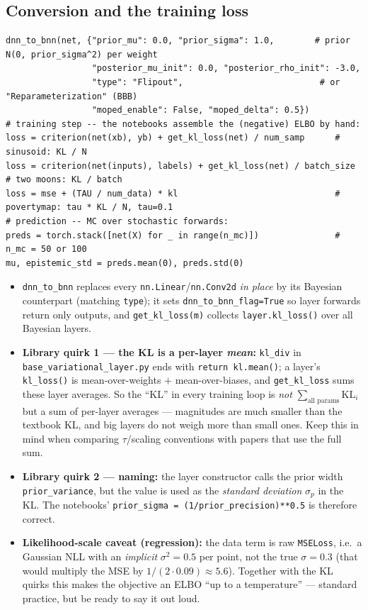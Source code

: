 \documentclass[10pt,a4paper]{article}
\newcommand{\code}[1]{\texttt{#1}}
\newcommand{\KL}{\mathrm{KL}}
\begin{document}
\subsection{Conversion and the training loss}
\begin{lstlisting}
dnn_to_bnn(net, {"prior_mu": 0.0, "prior_sigma": 1.0,        # prior N(0, prior_sigma^2) per weight
                 "posterior_mu_init": 0.0, "posterior_rho_init": -3.0,
                 "type": "Flipout",                           # or "Reparameterization" (BBB)
                 "moped_enable": False, "moped_delta": 0.5})
# training step -- the notebooks assemble the (negative) ELBO by hand:
loss = criterion(net(xb), yb) + get_kl_loss(net) / num_samp      # sinusoid: KL / N
loss = criterion(net(inputs), labels) + get_kl_loss(net) / batch_size   # two moons: KL / batch
loss = mse + (TAU / num_data) * kl                               # povertymap: tau * KL / N, tau=0.1
# prediction -- MC over stochastic forwards:
preds = torch.stack([net(X) for _ in range(n_mc)])               # n_mc = 50 or 100
mu, epistemic_std = preds.mean(0), preds.std(0)
\end{lstlisting}
\begin{itemize}
\item \code{dnn\_to\_bnn} replaces every \code{nn.Linear}/\code{nn.Conv2d} \emph{in place} by its
  Bayesian counterpart (matching \code{type}); it sets \code{dnn\_to\_bnn\_flag=True} so layer
  forwards return only outputs, and \code{get\_kl\_loss(m)} collects
  \code{layer.kl\_loss()} over all Bayesian layers.
\item \textbf{Library quirk 1 --- the KL is a per-layer \emph{mean}:} \code{kl\_div} in
  \code{base\_variational\_layer.py} ends with \code{return kl.mean()}; a layer's
  \code{kl\_loss()} is mean-over-weights $+$ mean-over-biases, and \code{get\_kl\_loss} sums these
  layer averages. So the ``KL'' in every training loop is \emph{not}
  $\sum_{\text{all params}}\KL_i$ but a sum of per-layer averages --- magnitudes are much smaller
  than the textbook KL, and big layers do not weigh more than small ones. Keep this in mind when
  comparing $\tau$/scaling conventions with papers that use the full sum.
\item \textbf{Library quirk 2 --- naming:} the layer constructor calls the prior width
  \code{prior\_variance}, but the value is used as the \emph{standard deviation}
  $\sigma_p$ in the KL. The notebooks' \code{prior\_sigma = (1/prior\_precision)**0.5} is therefore
  correct.
\item \textbf{Likelihood-scale caveat (regression):} the data term is raw \code{MSELoss}, i.e.\ a
  Gaussian NLL with an \emph{implicit} $\sigma^2=0.5$ per point, not the true $\sigma=0.3$
  (that would multiply the MSE by $1/(2\cdot0.09)\approx5.6$). Together with the KL quirks this
  makes the objective an ELBO ``up to a temperature'' --- standard practice, but be ready to say
  it out loud.
\end{itemize}
\end{document}
